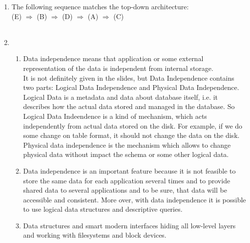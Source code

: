 \documentclass[10pt]{article}
\begin{document}
\begin{enumerate}[label=\arabic*.]
      \item
        The following sequence matches the top-down architecture:\\
        (E) $\Rightarrow$ (B) $\Rightarrow$ (D) $\Rightarrow$ (A) $\Rightarrow$ (C)\\\\
      \item
      	\begin{enumerate}[label=\alph*.] 
          \item Data independence means that application or some external representation of
          the data is independent from internal storage.\\
          It is not definitely given in the slides, but Data Independence contains
          two parts: Logical Data Independence and Physical Data Independence. Logical Data
          is a metadata and data about database itself, i.e. it describes how the actual
          data stored and managed in the database. So Logical Data Indeendence is a kind of
          mechanism, which acts independently from actual data stored on the disk. For example,
          if we do some change on table format, it should not change the data on the disk.\\
          Physical data independence is the mechanism which allows to change physical data
          without impact the schema or some other logical data.\\
          \item Data independence is an important feature because it is not feasible to store
          the same data for each application several times and to provide shared data to
          several applications and to be sure, that data will be accessible and consistent.
          More over, with data independence it is possible to use logical data structures
          and descriptive queries.\\
          \item Data structures and smart modern interfaces hiding all low-level layers and working
        with filesystems and block devices.
        \end{enumerate}
  \end{enumerate}
  
\end{document}
